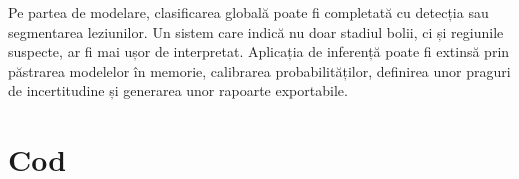 \documentclass[12pt, a4paper, oneside, romanian]{teza-upb}
\begin{document}
Pe partea de modelare, clasificarea globală poate fi completată cu detecția sau segmentarea leziunilor. Un sistem care indică nu doar stadiul bolii, ci și regiunile suspecte, ar fi mai ușor de interpretat. Aplicația de inferență poate fi extinsă prin păstrarea modelelor în memorie, calibrarea probabilităților, definirea unor praguri de incertitudine și generarea unor rapoarte exportabile.

\newpage
\mbox{}
\newpage

\appendix



\chapter {Cod}


\vspace{1cm}


\vspace{1cm}


\vspace{1cm}
\end{document}
